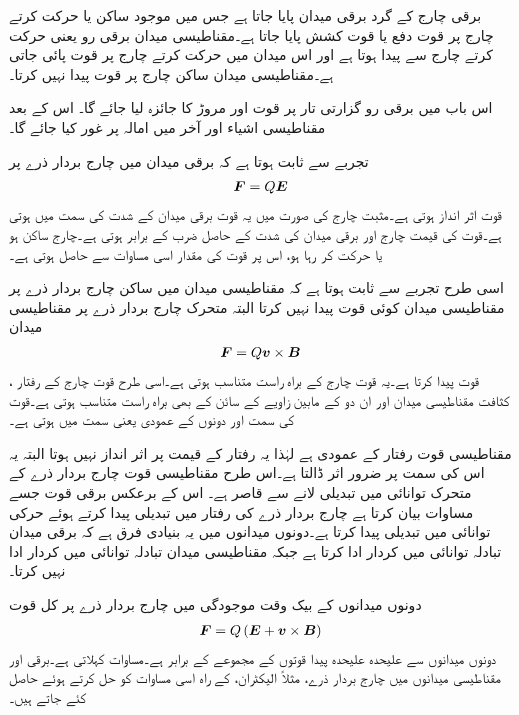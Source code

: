 برقی چارج کے گرد برقی میدان پایا جاتا ہے جس میں موجود ساکن یا حرکت کرتے چارج پر قوت دفع یا قوت کشش پایا جاتا ہے۔مقناطیسی میدان برقی رو یعنی حرکت کرتے چارج سے پیدا ہوتا ہے اور اس میدان میں حرکت کرتے چارج پر قوت پائی جاتی ہے۔مقناطیسی میدان ساکن چارج پر قوت پیدا نہیں کرتا۔

اس باب میں برقی رو گزارتی تار پر قوت اور مروڑ  کا جائزہ لیا جائے گا۔ اس کے بعد مقناطیسی اشیاء اور آخر میں امالہ پر غور کیا جائے گا۔

تجربے سے  ثابت ہوتا ہے کہ برقی میدان میں چارج بردار ذرے  پر 
\begin{align}\label{مساوات_امالہ_برقی_قوت}
{\ensuremath{{\boldsymbol{F}}}}=Q {{\boldsymbol{E}}}
\end{align}
قوت اثر انداز ہوتی ہے۔مثبت چارج کی صورت میں یہ قوت برقی میدان کے شدت  کی سمت میں ہوتی ہے۔قوت کی قیمت چارج  اور برقی میدان کی شدت  کے حاصل ضرب کے برابر ہوتی ہے۔چارج ساکن ہو یا حرکت کر رہا ہو، اس پر قوت کی مقدار اسی مساوات سے حاصل ہوتی ہے۔

اسی طرح تجربے سے ثابت ہوتا ہے کہ مقناطیسی میدان میں ساکن چارج بردار ذرے  پر مقناطیسی میدان کوئی قوت پیدا نہیں کرتا البتہ متحرک چارج بردار ذرے  پر مقناطیسی میدان
\begin{align}\label{مساوات_امالہ_مقناطیسی_قوت}
{\ensuremath{{\boldsymbol{F}}}}=Q {{\boldsymbol{v}}} \times {\ensuremath{{\boldsymbol{B}}}} 
\end{align}
قوت پیدا کرتا ہے۔یہ قوت چارج  کے براہ راست متناسب ہوتی ہے۔اسی طرح قوت چارج کے رفتار ،  کثافت مقناطیسی میدان  اور ان دو کے مابین زاویے کے سائن کے بھی براہ راست متناسب ہوتی ہے۔قوت کی سمت  اور  دونوں کے عمودی یعنی  سمت میں ہوتی ہے۔

مقناطیسی قوت رفتار کے عمودی ہے لہٰذا یہ رفتار کے قیمت پر اثر انداز نہیں ہوتا البتہ یہ اس کی سمت پر ضرور اثر ڈالتا ہے۔اس طرح مقناطیسی قوت چارج بردار ذرے کے متحرک توانائی میں تبدیلی لانے سے قاصر ہے۔ اس کے برعکس برقی قوت جسے مساوات  بیان کرتا ہے چارج بردار ذرے کی رفتار میں تبدیلی پیدا کرتے ہوئے حرکی توانائی میں تبدیلی پیدا کرتا ہے۔دونوں میدانوں میں یہ بنیادی فرق ہے کہ برقی میدان تبادلہ توانائی میں کردار ادا کرتا ہے جبکہ مقناطیسی میدان تبادلہ توانائی میں کردار ادا نہیں کرتا۔

دونوں میدانوں کے بیک وقت موجودگی میں چارج بردار ذرے پر کل قوت
\begin{align}\label{مساوات_امالہ_لورنز}
{\ensuremath{{\boldsymbol{F}}}}=Q\left({{\boldsymbol{E}}}+{{\boldsymbol{v}}} \times {\ensuremath{{\boldsymbol{B}}}} \right)
\end{align}
دونوں میدانوں سے علیحدہ علیحدہ پیدا قوتوں کے مجموعے کے برابر ہے۔مساوات   کہلاتی ہے۔برقی اور مقناطیسی میدانوں میں چارج بردار ذرے، مثلاً الیکٹران، کے راہ اسی مساوات کو حل کرتے ہوئے حاصل کئے جاتے ہیں۔

